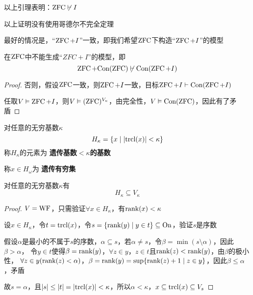 \documentclass[11pt]{article}
\begin{document}
以上引理表明：\(\operatorname{ZFC}\not\vdash I\)

以上证明没有使用哥德尔不完全定理

最好的情况是，“\(\operatorname{ZFC}+I\)”一致，即我们希望\(\operatorname{ZFC}\)下构造“\(\operatorname{ZFC}+I\)”的模型

\begin{corollary}[]
在\(\operatorname{ZFC}\)中不能生成“\(ZFC+I\)”的模型，即
\begin{equation*}
\operatorname{ZFC}+\text{Con}(\operatorname{ZFC})\not\vdash\text{Con}(\operatorname{ZFC}+I)
\end{equation*}
\end{corollary}

\begin{proof}
否则，假设\(\operatorname{ZFC}\)一致，则\(\operatorname{ZFC}+I\)一致，目标\(\operatorname{ZFC}+I\vdash\text{Con}(\operatorname{ZFC}+I)\)

任取\(V\vDash\operatorname{ZFC}+I\)，则\(V\vDash(\operatorname{ZFC})^{V_\kappa}\)，由完全性，\(V\vDash\text{Con}(\operatorname{ZFC})\)，因此有了矛盾
\end{proof}

\begin{definition}[]
对任意的无穷基数\(\kappa\)
\begin{equation*}
H_\kappa=\{x\mid\abs{\trcl(x)}<\kappa\}
\end{equation*}
称\(H_\kappa\)的元素为 \textbf{遗传基数\(<\kappa\)的基数}

称\(x\in H_\omega\)为 \textbf{遗传有穷集}
\end{definition}

\begin{lemma}
对任意的无穷基数\(\kappa\)有
\begin{equation*}
H_\kappa\subseteq V_\kappa
\end{equation*}
\end{lemma}

\begin{proof}
\(V=\operatorname{WF}\)，只需验证\(\forall x\in H_\kappa\)，有\(\text{rank}(x)<\kappa\)

设\(x\in H_\kappa\)，令\(t=\operatorname{\text{trcl}}(x)\)，令\(s=\{\text{rank}(y)\mid y\in t\}\subseteq\operatorname{On}\)，验证\(s\)是序数

假设\(\alpha\)是最小的不属于\(s\)的序数，\(\alpha\subseteq s\)，若\(\alpha\neq s\)，令\(\beta=\min(s\setminus\alpha)\)，因此\(\beta>\alpha\)，
令\(y\in t\)使得\(\beta=\text{rank}(y)\)，\(\forall z\in y\)，\(z\in t\)且\(\text{rank}(z)<\text{rank}(y)\)，由\(\beta\)的极小性，
\(\forall z\in y(\text{rank}(z)<\alpha)\)，\(\beta=\text{rank}(y)=\sup\{\text{rank}(z)+1\mid z\in y\}\)，因此\(\beta\le\alpha\)，矛盾

故\(s=\alpha\)，且\(\abs{s}\le\abs{t}=\abs{\trcl(x)}<\kappa\)，所以\(\alpha<\kappa\)，\(x\subseteq\operatorname{\text{trcl}}(x)\subseteq V_s\)
\end{proof}
\end{document}
